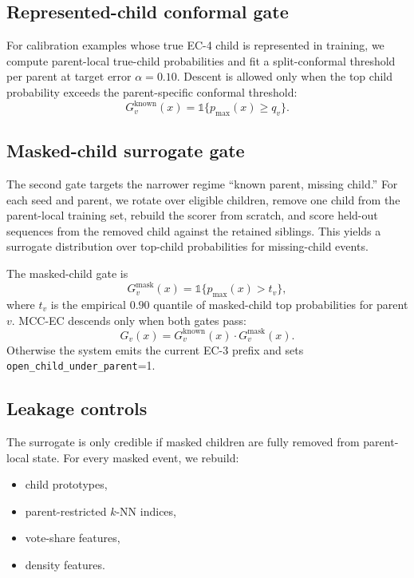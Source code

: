 \documentclass{article}
\newcommand{\method}{MCC-EC\xspace}
\begin{document}
\subsection{Represented-child conformal gate}

For calibration examples whose true EC-4 child is represented in training, we compute parent-local true-child probabilities and fit a split-conformal threshold per parent at target error $\alpha=0.10$. Descent is allowed only when the top child probability exceeds the parent-specific conformal threshold:
\begin{equation}
G_v^{\mathrm{known}}(x)=\mathbb{1}\{p_{\max}(x) \ge q_v\}.
\end{equation}

\subsection{Masked-child surrogate gate}

The second gate targets the narrower regime ``known parent, missing child.'' For each seed and parent, we rotate over eligible children, remove one child from the parent-local training set, rebuild the scorer from scratch, and score held-out sequences from the removed child against the retained siblings. This yields a surrogate distribution over top-child probabilities for missing-child events.

The masked-child gate is
\begin{equation}
G_v^{\mathrm{mask}}(x)=\mathbb{1}\{p_{\max}(x) > t_v\},
\end{equation}
where $t_v$ is the empirical $0.90$ quantile of masked-child top probabilities for parent $v$. \method descends only when both gates pass:
\begin{equation}
G_v(x)=G_v^{\mathrm{known}}(x)\cdot G_v^{\mathrm{mask}}(x).
\end{equation}
Otherwise the system emits the current EC-3 prefix and sets \texttt{open\_child\_under\_parent}=1.

\subsection{Leakage controls}

The surrogate is only credible if masked children are fully removed from parent-local state. For every masked event, we rebuild:
\begin{itemize}
\item child prototypes,
\item parent-restricted $k$-NN indices,
\item vote-share features,
\item density features.
\end{itemize}
\end{document}
